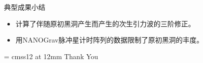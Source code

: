\documentclass[xcolor=dvipsnames]{beamer} %
\begin{document}
\begin{frame}{典型成果小结} 
\begin{itemize}
    \item 计算了伴随原初黑洞产生而产生的次生引力波的三阶修正。
    \vspace{2mm}\pause
        
    \item 用NANOGrav脉冲星计时阵列的数据限制了原初黑洞的丰度。 
\end{itemize} 
\pause
\begin{center}
    \font\endfont = cmss12 at 12mm
    \color{Blue}
    \endfont
    \baselineskip 20.0mm
    Thank You
\end{center} 
\end{frame}



\end{document}
